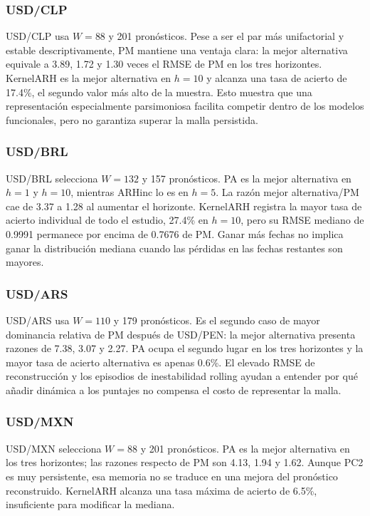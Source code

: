 \documentclass[a4paper,11pt]{article}
\begin{document}
\subsubsection{USD/CLP}

USD/CLP usa \(W=88\) y 201 pronósticos. Pese a ser el par más unifactorial y estable descriptivamente, PM mantiene una ventaja clara: la mejor alternativa equivale a 3.89, 1.72 y 1.30 veces el RMSE de PM en los tres horizontes. KernelARH es la mejor alternativa en \(h=10\) y alcanza una tasa de acierto de 17.4\%, el segundo valor más alto de la muestra. Esto muestra que una representación especialmente parsimoniosa facilita competir dentro de los modelos funcionales, pero no garantiza superar la malla persistida.

\subsubsection{USD/BRL}

USD/BRL selecciona \(W=132\) y 157 pronósticos. PA es la mejor alternativa en \(h=1\) y \(h=10\), mientras ARHinc lo es en \(h=5\). La razón mejor alternativa/PM cae de 3.37 a 1.28 al aumentar el horizonte. KernelARH registra la mayor tasa de acierto individual de todo el estudio, 27.4\% en \(h=10\), pero su RMSE mediano de 0.9991 permanece por encima de 0.7676 de PM. Ganar más fechas no implica ganar la distribución mediana cuando las pérdidas en las fechas restantes son mayores.

\subsubsection{USD/ARS}

USD/ARS usa \(W=110\) y 179 pronósticos. Es el segundo caso de mayor dominancia relativa de PM después de USD/PEN: la mejor alternativa presenta razones de 7.38, 3.07 y 2.27. PA ocupa el segundo lugar en los tres horizontes y la mayor tasa de acierto alternativa es apenas 0.6\%. El elevado RMSE de reconstrucción y los episodios de inestabilidad rolling ayudan a entender por qué añadir dinámica a los puntajes no compensa el costo de representar la malla.

\subsubsection{USD/MXN}

USD/MXN selecciona \(W=88\) y 201 pronósticos. PA es la mejor alternativa en los tres horizontes; las razones respecto de PM son 4.13, 1.94 y 1.62. Aunque PC2 es muy persistente, esa memoria no se traduce en una mejora del pronóstico reconstruido. KernelARH alcanza una tasa máxima de acierto de 6.5\%, insuficiente para modificar la mediana.
\end{document}
